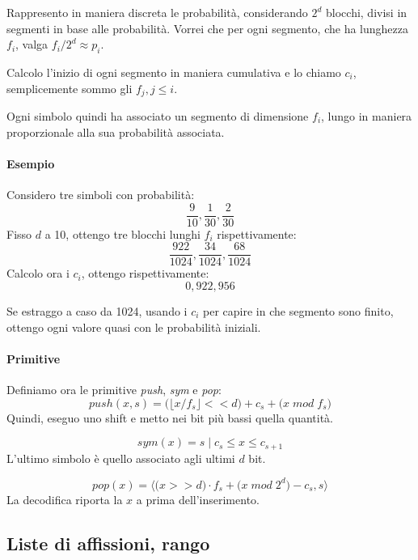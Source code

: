 Rappresento in maniera discreta le probabilità, considerando $2^d$ blocchi, divisi in segmenti in base alle probabilità. 
Vorrei che per ogni segmento, che ha lunghezza $f_i$, valga $f_i/2^d \approx p_i$.

Calcolo l'inizio di ogni segmento in maniera cumulativa e lo chiamo $c_i$, semplicemente sommo gli $f_j, j \leq i$.

Ogni simbolo quindi ha associato un segmento di dimensione $f_i$, lungo 
in maniera proporzionale alla sua probabilità associata.

\paragraph{Esempio}
Considero tre simboli con probabilità: $$\frac{9}{10}, \frac{1}{30}, \frac{2}{30}$$
Fisso $d$ a 10, ottengo tre blocchi lunghi $f_i$ rispettivamente: 
$$\frac{922}{1024}, \frac{34}{1024}, \frac{68}{1024}$$
Calcolo ora i $c_i$, ottengo rispettivamente: 
$$0, 922, 956$$
\begin{remark}
    Se estraggo a caso da 1024, usando i $c_i$ per capire in che segmento sono finito, 
    ottengo ogni valore quasi con le probabilità iniziali. 
\end{remark}

\paragraph{Primitive}
Definiamo ora le primitive \emph{push}, \emph{sym} e \emph{pop}:
$$\mathit{push}(x, s) = \big( \big\lfloor x/ f_s \big\rfloor << d \big)
+ c_s + \big( x\;\textit{mod}\;f_s \big)$$
Quindi, eseguo uno shift e metto nei bit più bassi quella quantità.

$$\mathit{sym}(x) = s\; | \; c_s \leq x \leq c_{s+1}$$
L'ultimo simbolo è quello associato agli ultimi $d$ bit. 

$$\mathit{pop}(x) = \langle \big(x >> d\big) \cdot f_s + \big( x\;\textit{mod}\;2^d \big) - c_s, s \rangle$$
La decodifica riporta la $x$ a prima dell'inserimento.

\subsection{Liste di affissioni, rango}
